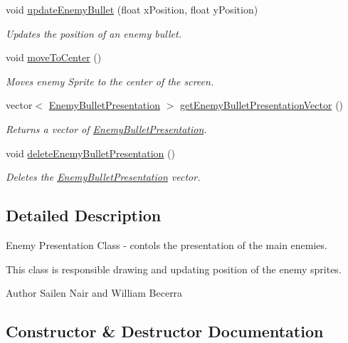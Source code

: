 \begin{DoxyCompactItemize}
void \hyperlink{class_enemy_presentation_ad7d1f196be857ea51b2ced17b5199b40}{update\+Enemy\+Bullet} (float x\+Position, float y\+Position)
\begin{DoxyCompactList}\small\item\em Updates the position of an enemy bullet. \end{DoxyCompactList}\item 
void \hyperlink{class_enemy_presentation_a8e6b10042366b1af3ddd99878cae36a9}{move\+To\+Center} ()
\begin{DoxyCompactList}\small\item\em Moves enemy Sprite to the center of the screen. \end{DoxyCompactList}\item 
vector$<$ \hyperlink{class_enemy_bullet_presentation}{Enemy\+Bullet\+Presentation} $>$ \hyperlink{class_enemy_presentation_a64c5863ad2f83c1414cf69882293e4b9}{get\+Enemy\+Bullet\+Presentation\+Vector} ()
\begin{DoxyCompactList}\small\item\em Returns a vector of \hyperlink{class_enemy_bullet_presentation}{Enemy\+Bullet\+Presentation}. \end{DoxyCompactList}\item 
void \hyperlink{class_enemy_presentation_abad20ddfb250e1c31a4d4581fa7d2571}{delete\+Enemy\+Bullet\+Presentation} ()
\begin{DoxyCompactList}\small\item\em Deletes the \hyperlink{class_enemy_bullet_presentation}{Enemy\+Bullet\+Presentation} vector. \end{DoxyCompactList}\end{DoxyCompactItemize}


\subsection{Detailed Description}
Enemy Presentation Class -\/ contols the presentation of the main enemies. 

This class is responsible drawing and updating position of the enemy sprites. \begin{DoxyAuthor}{Author}
Sailen Nair and William Becerra 
\end{DoxyAuthor}


\subsection{Constructor \& Destructor Documentation}
\mbox{\label{class_enemy_presentation_aa17b851454a7bc3a86a6c20e803f5e76}} 

